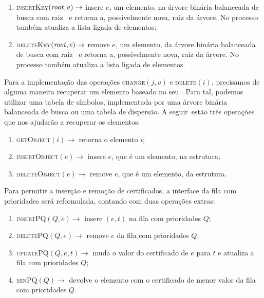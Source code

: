 \begin{enumerate}
    \item \textsc{insertKey}$(\text{\textit{root}},e)\rightarrow$ insere
    $e$, um elemento, na árvore binária balanceada de busca com raiz
    \raiz~e retorna a, possivelmente nova, raiz da árvore. No
    processo também atualiza a lista ligada de elementos;

    \item \textsc{deleteKey}$(\text{\textit{root}},e)\rightarrow$ remove
    $e$, um elemento, da árvore binária balanceada de busca com raiz
    \raiz~e retorna a, possivelmente nova, raiz da árvore. No
    processo também atualiza a lista ligada de elementos.

\end{enumerate}
Para a implementação das operações \textsc{change}$(j, v)$ e
\textsc{delete}$(i)$, precisamos de alguma maneira recuperar um
elemento baseado no seu \id. Para tal, podemos utilizar uma tabela
de símbolos, implementada por uma árvore binária balanceada de busca
ou uma tabela de dispersão. A seguir~estão três operações que nos
ajudarão a recuperar os elementos:

\begin{enumerate}
    \item \textsc{getObject}$(i)\rightarrow$ retorna o elemento $i$;
    \item \textsc{insertObject}$(e) \rightarrow$ insere $e$,
    que é um elemento, na estrutura;
    \item \textsc{deleteObject}$(e) \rightarrow$ remove $e$,
    que é um elemento, da estrutura.
\end{enumerate}

Para permitir a inserção e remoção de certificados, a interface da
fila com prioridades será reformulada, contando com duas operações
extras:

\begin{enumerate}
    \item \textsc{insertPQ}$(Q, e) \rightarrow$ insere $(e, t)$
    na fila com prioridades $Q$;
    \item \textsc{deletePQ}$(Q, e) \rightarrow$ remove $e$
    da fila com prioridades $Q$;
    \item \textsc{updatePQ}$(Q,e,t) \rightarrow$ muda o
    valor do certificado de $e$ para $t$ e atualiza a fila
    com prioridades $Q$;
    \item \textsc{minPQ}$(Q) \rightarrow$ devolve o elemento
    com o certificado de menor valor da fila com prioridades $Q$.
\end{enumerate}

